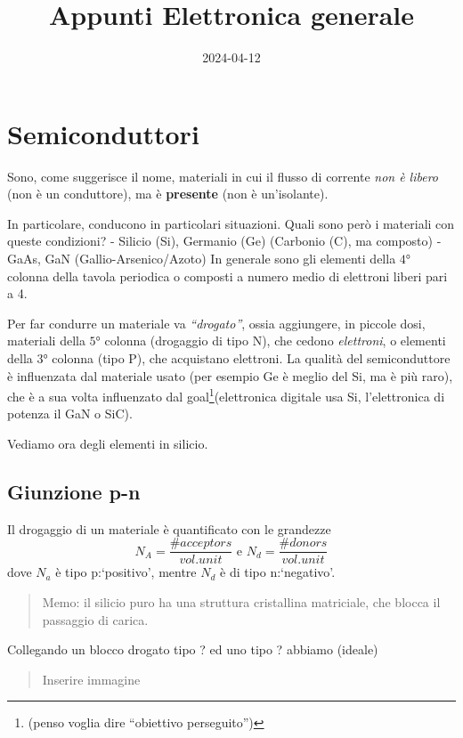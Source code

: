 \documentclass[
]{article}
\title{Appunti Elettronica generale}
\author{}
\date{2024-04-12}
\begin{document}
\maketitle

\section{Semiconduttori}\label{semiconduttori}

Sono, come suggerisce il nome, materiali in cui il flusso di corrente
\emph{non è libero} (non è un conduttore), ma è \textbf{presente} (non è
un'isolante).

In particolare, conducono in particolari situazioni. Quali sono però i
materiali con queste condizioni? - Silicio (Si), Germanio (Ge) (Carbonio
(C), ma composto) - GaAs, GaN (Gallio-Arsenico/Azoto) In generale sono
gli elementi della \(4°\) colonna della tavola periodica o composti a
numero medio di elettroni liberi pari a 4.

Per far condurre un materiale va \emph{``drogato''}, ossia aggiungere,
in piccole dosi, materiali della \(5°\) colonna (drogaggio di tipo N),
che cedono \emph{elettroni}, o elementi della \(3°\) colonna (tipo P),
che acquistano elettroni. La qualità del semiconduttore è influenzata
dal materiale usato (per esempio Ge è meglio del Si, ma è più raro), che
è a sua volta influenzato dal goal\footnote{(penso voglia dire
  ``obiettivo perseguito'')}(elettronica digitale usa Si, l'elettronica
di potenza il GaN o SiC).

Vediamo ora degli elementi in silicio.

\subsection{Giunzione p-n}\label{giunzione-p-n}

Il drogaggio di un materiale è quantificato con le grandezze \[
N_A = \frac{\# acceptors}{vol. unit} \text{ e } N_d=\frac{\# donors}{vol. unit}
\] dove \(N_a\) è tipo p:`positivo', mentre \(N_d\) è di tipo
n:`negativo'.

\begin{quote}
Memo: il silicio puro ha una struttura cristallina matriciale, che
blocca il passaggio di carica.
\end{quote}

Collegando un blocco drogato tipo ? ed uno tipo ? abbiamo (ideale)

\begin{quote}
Inserire immagine
\end{quote}
\end{document}
